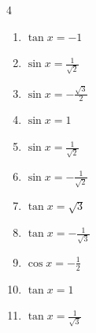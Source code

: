 \begin{multicols}{4}
\begin{enumerate}
  \item $\displaystyle \tan{x}  = -1$


\columnbreak %

  \item $\displaystyle \sin{x}  = \frac{1}{\sqrt{2}}$


  \item $\displaystyle \sin{x}  = -\frac{\sqrt{3}}{2}$


  \item $\displaystyle \sin{x}  = 1$


  \item $\displaystyle \sin{x}  = \frac{1}{\sqrt{2}}$


  \item $\displaystyle \sin{x}  = -\frac{1}{\sqrt{2}}$


  \item $\displaystyle \tan{x}  = \sqrt{3}$


  \item $\displaystyle \tan{x}  = -\frac{1}{\sqrt{3}}$


  \item $\displaystyle \cos{x}  = -\frac{1}{2}$


  \item $\displaystyle \tan{x}  = 1$


  \item $\displaystyle \tan{x}  = \frac{1}{\sqrt{3}}$



\end{enumerate}
\end{multicols}
